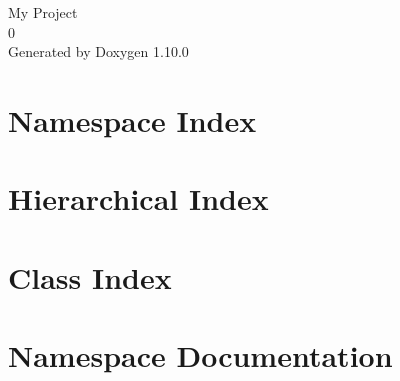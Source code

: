 \documentclass[twoside]{book}
\newcommand{\+}{\discretionary{\mbox{\scriptsize$\hookleftarrow$}}{}{}}
\newcommand{\clearemptydoublepage}{%
    \newpage{\pagestyle{empty}\cleardoublepage}%
  }
\begin{document}
  \raggedbottom
    \hypersetup{pageanchor=false,
                bookmarksnumbered=true,
                pdfencoding=unicode
               }
  \begin{titlepage}
  \vspace*{7cm}
  \begin{center}%
  {\Large My Project}\\
  [1ex]\large 0 \\
  \vspace*{1cm}
  {\large Generated by Doxygen 1.10.0}\\
  \end{center}
  \end{titlepage}
  \clearemptydoublepage
  \tableofcontents
  \clearemptydoublepage
  \hypersetup{pageanchor=true}

\chapter{Namespace Index}

\chapter{Hierarchical Index}

\chapter{Class Index}

\chapter{Namespace Documentation}










\end{document}
